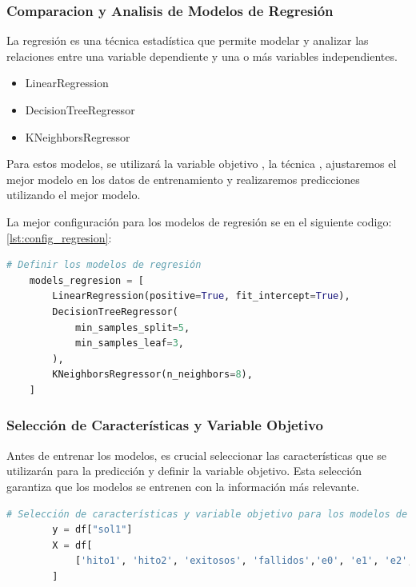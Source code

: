 \subsubsection{Comparacion y Analisis de Modelos de Regresión}

La regresión es una técnica estadística que permite modelar y analizar las relaciones entre una variable dependiente y una o más variables independientes.

\begin{itemize}
    \item LinearRegression
    \item DecisionTreeRegressor
    \item KNeighborsRegressor
\end{itemize}

Para estos modelos, se utilizará la variable objetivo , la técnica , ajustaremos el mejor modelo en los datos de entrenamiento y realizaremos predicciones utilizando el mejor modelo.

La mejor configuración para los modelos de regresión se en el siguiente codigo: \ref{lst:config_regresion}:

\begin{lstlisting}[language=Python, caption=Configuración de los modelos de regresión, label=lst:config_regresion]
    # Definir los modelos de regresión
    models_regresion = [
        LinearRegression(positive=True, fit_intercept=True),
        DecisionTreeRegressor(
            min_samples_split=5,
            min_samples_leaf=3,
        ),
        KNeighborsRegressor(n_neighbors=8),
    ]
    \end{lstlisting}


\subsubsection{Selección de Características y Variable Objetivo}
Antes de entrenar los modelos, es crucial seleccionar las características que se utilizarán para la predicción y definir la variable objetivo. Esta selección garantiza que los modelos se entrenen con la información más relevante.

\begin{lstlisting}[language=Python, caption=Seleccion de caracteristica y variable objetivo, label=lst:config_varObjetivoCaracteristicas]
        # Selección de características y variable objetivo para los modelos de Regresion.
        y = df["sol1"]
        X = df[
            ['hito1', 'hito2', 'exitosos', 'fallidos','e0', 'e1', 'e2', 'e3', 'e4', 'e5', 'e6', 'e7', 'e8', 'e9', 'e10', 'e11', 'e12', 'e13', 'e14', 'e15', 'e16', 'e17', 'e18', 'e19', 'e20', 'e21', 'e22', 'e23', 'e24', 'e25', 'e26', 'e27', 'e28', 'e29', 'e30', 'e31', 'e32', 'e33', 'e34', 'e35', 'e36', 'e37', 'e38', 'e39', 'e40', 'e41', 'e42', 'e43', 'e44', 'e45', 'e46', 'e47', 'e48', 'e49', 'e50', 'e51', 'e52']
        ]
    \end{lstlisting}


